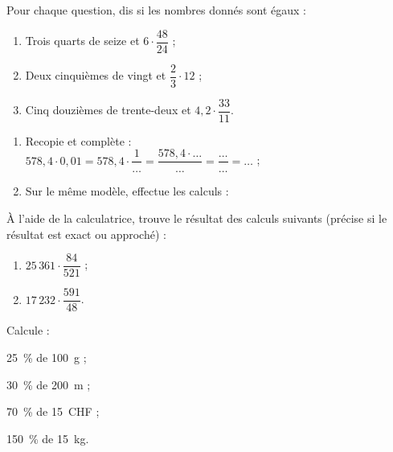 \begin{exercice}
Pour chaque question, dis si les nombres donnés sont égaux :
\begin{enumerate}
 \item Trois quarts de seize et $6 \cdot \dfrac{48}{24}$ ;
 \item Deux cinquièmes de vingt et $\dfrac{2}{3} \cdot 12$ ;
 \item Cinq douzièmes de trente-deux et $4,2 \cdot \dfrac{33}{11}$.
 \end{enumerate}
\end{exercice}


\begin{exercice}
\begin{enumerate}
 \item Recopie et complète : \\[0.2em]
$578,4 \cdot 0,01 = 578,4 \cdot \dfrac{1}{\ldots} = \dfrac{578,4 \cdot \ldots}{\ldots} = \dfrac{\ldots}{\ldots} = \ldots$ ;
\vspace{0.2cm}       
 \item Sur le même modèle, effectue les calculs :
 \end{enumerate}
\end{exercice}


\begin{exercice}
À l'aide de la calculatrice, trouve le résultat des calculs suivants (précise si le résultat est exact ou approché) :
\begin{enumerate}
 \item $25\,361 \cdot \dfrac{84}{521}$ ;
 \vspace{0.2cm}
 \item $17\,232 \cdot \dfrac{591}{48}$.
 \end{enumerate}
\end{exercice}


\begin{exercice}
Calcule :
\begin{colenumerate}{2}
 \item 25 \% de 100 g ;
 \item 30 \% de 200 m ;
 \item 70 \% de 15 CHF ;
 \item 150 \% de 15 kg.
 \end{colenumerate}
\end{exercice}


